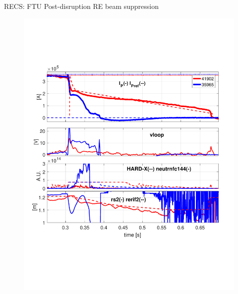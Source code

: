 \documentclass{beamer}
\begin{document}
\begin{frame}{RECS: FTU Post-disruption RE beam suppression}

    \begin{figure}[h]
    	\vspace*{-2cm}
        \centering
        \includegraphics[width=0.7\linewidth]{Chapter3Fig/example.pdf}
    \end{figure}

\end{frame}
\end{document}
